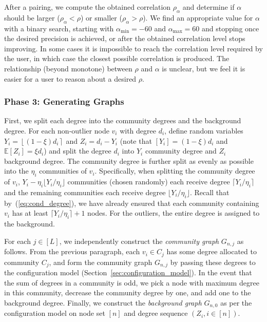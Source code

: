 \documentclass[review,los,12pt]{ryethesis}
\newcommand{\E}{{\mathbb E}}
\newcommand{\round}[1]{\ensuremath{\left\lfloor #1 \right\rceil}}
\begin{document}
After a pairing, we compute the obtained correlation $\rho_\alpha$ and determine if $\alpha$ should be larger ($\rho_\alpha < \rho$) or smaller ($\rho_\alpha > \rho$).
We find an appropriate value for $\alpha$ with a binary search, starting with $\alpha_{\min}=-60$ and $\alpha_{\max}=60$ and stopping once the desired precision is achieved, or after the obtained correlation level stops improving.
In some cases it is impossible to reach the correlation level required by the user, in which case the closest possible correlation is produced.
The relationship (beyond monotone) between $\rho$ and $\alpha$ is unclear, but we feel it is easier for a user to reason about a desired $\rho$.

\subsubsection*{Phase 3: Generating Graphs}
First, we split each degree into the community degrees and the background degree.
For each non-outlier node $v_i$ with degree $d_i$, define random variables $Y_i = \round{(1-\xi) d_i}$ and $Z_i = d_i - Y_i$ (note that $[Y_i] = (1-\xi) d_i$ and $\E[Z_i] = \xi d_i$) and split the degree $d_i$ into $Y_i$ community degree and $Z_i$ background degree.
The community degree is further split as evenly as possible into the $\eta_i$ communities of $v_i$.
Specifically, when splitting the community degree of $v_i$, $Y_i - \eta_i \lfloor Y_i/\eta_i \rfloor$ communities (chosen randomly) each receive degree $\lceil Y_i/\eta_i \rceil$ and the remaining communities each receive degree $\lfloor Y_i/\eta_i \rfloor$.
Recall that by~(\ref{eq:cond_degree}), we have already ensured that each community containing $v_i$ has at least $\lceil Y_i/\eta_i \rceil+1$ nodes.
For the outliers, the entire degree is assigned to the background.

For each $j \in [L]$, we independently construct the \textit{community graph} $G_{n,j}$ as follows.
From the previous paragraph, each $v_i \in C_j$ has some degree allocated to community $C_j$, and form the community graph $G_{n, j}$ by passing these degrees to the configuration model (Section~\ref{sec:configuration_model}).
In the event that the sum of degrees in a community is odd, we pick a node with maximum degree in this community, decrease the community degree by one, and add one to the background degree.
Finally, we construct the \textit{background graph} $G_{n,0}$ as per the configuration model on node set $[n]$ and degree sequence $(Z_i,i \in [n])$.
\end{document}
